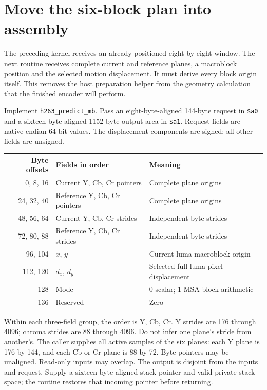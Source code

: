 \section{Move the six-block plan into assembly}
The preceding kernel receives an already positioned eight-by-eight window.
The next routine receives complete current and reference planes, a macroblock
position and the selected motion displacement. It must derive every block origin
itself. This removes the host preparation helper from the geometry calculation
that the finished encoder will perform.

Implement \texttt{h263\_predict\_mb}. Pass an eight-byte-aligned 144-byte request
in \texttt{\$a0} and a sixteen-byte-aligned 1152-byte output area in
\texttt{\$a1}. Request fields are native-endian 64-bit values. The displacement
components are signed; all other fields are unsigned.
\begin{center}
  \begin{tabular}{rll}
    \textbf{Byte offsets} & \textbf{Fields in order}     & \textbf{Meaning}                      \\
    0, 8, 16              & Current Y, Cb, Cr pointers   & Complete plane origins                \\
    24, 32, 40            & Reference Y, Cb, Cr pointers & Complete plane origins                \\
    48, 56, 64            & Current Y, Cb, Cr strides    & Independent byte strides              \\
    72, 80, 88            & Reference Y, Cb, Cr strides  & Independent byte strides              \\
    96, 104               & $x$, $y$                     & Current luma macroblock origin        \\
    112, 120              & $d_x$, $d_y$                 & Selected full-luma-pixel displacement \\
    128                   & Mode                         & 0 scalar; 1 MSA block arithmetic      \\
    136                   & Reserved                     & Zero
  \end{tabular}
\end{center}
Within each three-field group, the order is Y, Cb, Cr. Y strides are 176 through
4096; chroma strides are 88 through 4096. Do not infer one plane's stride from
another's. The caller supplies all active samples of the six planes: each Y
plane is 176 by 144, and each Cb or Cr plane is 88 by 72. Byte pointers may be
unaligned. Read-only inputs may overlap. The output is disjoint from the inputs
and request. Supply a sixteen-byte-aligned stack pointer and valid private stack
space; the routine restores that incoming pointer before returning.

